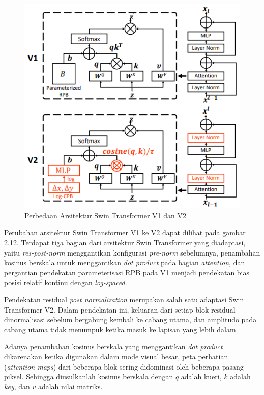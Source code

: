 \begin{figure}[ht]
  \centering
  \includegraphics[scale=0.75]{gambar/Perbedaan V1 V2.png}
  \caption{Perbedaan Arsitektur Swin Transformer V1 dan V2}
  \label{fig:perbandinganarsitekturswintransformerv1danv2}
\end{figure}

Perubahan arsitektur Swin Transformer V1 ke V2 dapat dilihat pada gambar 2.12. Terdapat tiga bagian dari arsitektur Swin Transformer yang diadaptasi, yaitu \emph{res-post-norm} menggantikan konfigurasi 
\emph{pre-norm} sebelumnya, penambahan kosinus berskala untuk menggantikan \emph{dot product} pada bagian \emph{attention}, dan pergantian pendekatan parameterisasi RPB pada V1 menjadi pendekatan bias posisi 
relatif kontinu dengan \emph{log-spaced}.\parencite{Liuv22021}

Pendekatan residual \emph{post normalization} merupakan salah satu adaptasi Swin Transformer V2. Dalam pendekatan ini, keluaran dari setiap blok residual dinormalisasi sebelum bergabung kembali ke 
cabang utama, dan amplitudo pada cabang utama tidak menumpuk ketika masuk ke lapisan yang lebih dalam.

Adanya penambahan kosinus berskala yang menggantikan \emph{dot product} dikarenakan ketika digunakan dalam mode visual besar, peta perhatian (\emph{attention maps}) dari beberapa blok sering didominasi 
oleh beberapa pasang piksel. Sehingga diusulkanlah kosinus berskala dengan \begin{math}q\end{math} adalah kueri, \begin{math}k\end{math} adalah \emph{key}, dan \begin{math}v\end{math} adalah nilai matriks.

